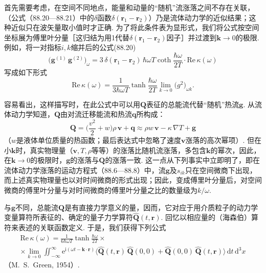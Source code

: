 首先需要考虑，在空间不同地点，能量和动量的“随机”流涨落之间不存在关联，（公式（88.20—88.21）中的$\delta$函数$\delta(\bm{r}_{1}-\bm{r}_{2})$）乃是流体动力学的近似结果；这种近似只在波矢量取小值时才正确. 为了将此条件表为显形式，我们将公式按空间坐标展为傅里叶分量［这归结为用1代替$\delta(\bm{r}_{1}-\bm{r}_{2})$因子］并过渡到$\bm{k}\to0$的极限. 例如，将一对指标$i,k$缩并后的公式(88.20)
\begin{equation*}
\bigl(\bm{g}^{(1)}\,\bm{g}^{(2)}\bigr)_{\omega}=3\,\delta(\bm{r}_{1}-\bm{r}_{2})\,\hbar\omega T\coth\frac{\hbar\omega}{2T}\cdot\mathrm{Re}\,\kappa(\omega)
\end{equation*}
写成如下形式
\begin{equation}
\mathrm{Re}\,\kappa(\omega)=\frac{1}{3\hbar\omega T}\tanh\frac{\hbar\omega}{2T}\lim_{k\to0}\bigl(g^{2}\bigr)_{\omega k}.
\end{equation}

容易看出，这样描写时，在此公式中可以用$\bm{Q}$表征的总能流代替“随机”热流$\bm{g}$. 从流体动力学知道，$\bm{Q}$由对流迁移能流和热流$\bm{q}$所构成：
\begin{equation}
\bm{Q}=\biggl(\frac{v^{2}}{2}+w\biggr)\rho\,\bm{v}+\bm{q}\approx\rho w\,\bm{v}-\kappa\,\nabla T+\bm{g}
\end{equation}
（$w$是液体单位质量的热函数；最后表达式中忽略了速度$\bm{v}$涨落的高次幂项）. 但在小$\bm{k}$时，真实物理量（$\bm{v},T,\rho$等等）的涨落比随机流涨落，多包含$\bm{k}$的幂次，因此，在$\bm{k}\to0$的极限时，$\bm{g}$的涨落与$\bm{Q}$的涨落一致. 这一点从下列事实中立即明了，即在流体动力学涨落的运动方程式（88.6—88.8）中，流$\bm{g}$及$s_{ik}$只在空间微商下出现，而上述真实物理量也以对时间微商的形式出现；因此，变成傅里叶分量后，对空间微商的傅里叶分量与对时间微商的傅里叶分量之比的数量级为$k/\omega$.

与$\bm{g}$不同，总能流$\bm{Q}$是有直接力学意义的量，因而，它对应于用介质粒子的动力学变量算符所表征的、确定的量子力学算符$\hat{\bm{Q}}(t,\bm{r})$. 回忆以相应量的（海森伯）算符来表述的关联函数定义. 于是，我们获得下列公式
\begin{equation}
\begin{split}
\mathrm{Re}\,\kappa(\omega)=\frac{1}{6\hbar\omega T}\tanh\frac{\hbar\omega}{2T}\times\\
\times\lim_{k\to0}\iint_{-\infty}^{\infty}\mathrm{e}^{\mathrm{i}(\omega t-\bm{k}\cdot\bm{r})}\bigl\langle\hat{\bm{Q}}(t,\bm{r})\,\hat{\bm{Q}}(0,0)+\hat{\bm{Q}}(0,0)\,\hat{\bm{Q}}(t,\bm{r})\bigr\rangle\,\mathrm{d}t\,\mathrm{d}^{3}x
\end{split}
\end{equation}
（M.~S.~Green, 1954）.

